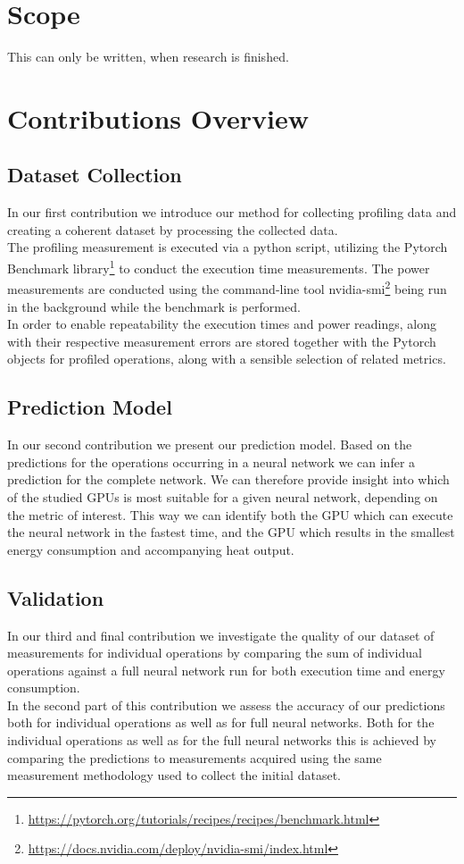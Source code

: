 \section{Scope}
This can only be written, when research is finished.


\section{Contributions Overview}
\subsection{Dataset Collection}
In our first contribution we introduce our method for collecting 
profiling data and creating a coherent dataset by processing the 
collected data.\\
The profiling measurement is executed via a python script, utilizing
the Pytorch Benchmark 
library\footnote{\url{https://pytorch.org/tutorials/recipes/recipes/benchmark.html}}
to conduct the execution time measurements. The power measurements
are conducted using the command-line tool 
nvidia-smi\footnote{\url{https://docs.nvidia.com/deploy/nvidia-smi/index.html}}
being run in the background while the benchmark is performed.\\
In order to enable repeatability the execution times and power readings,
along with their respective measurement errors are stored together with the
Pytorch objects for profiled operations, along with a sensible selection of
related metrics.

\subsection{Prediction Model}
In our second contribution we present our prediction model. Based on the predictions
for the operations occurring in a neural network we can infer a prediction for the 
complete network. We can therefore provide insight into which of the studied GPUs
is most suitable for a given neural network, depending on the metric of interest.
This way we can identify both the GPU which can execute the neural network in the
fastest time, and the GPU which results in the smallest energy consumption and
accompanying heat output.

\subsection{Validation}
In our third and final contribution we investigate the quality of our dataset of
measurements for individual operations by comparing the sum of individual operations
against a full neural network run for both execution time and energy consumption.\\
In the second part of this contribution we assess the accuracy of our predictions
both for individual operations as well as for full neural networks. Both for the
individual operations as well as for the full neural networks this is achieved by
comparing the predictions to measurements acquired using the same measurement
methodology used to collect the initial dataset.





